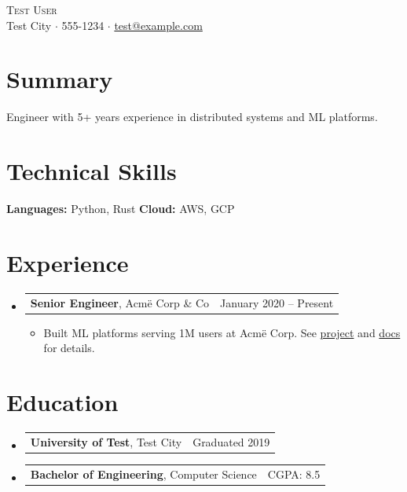 \documentclass[letterpaper,11pt]{article}
\makeatletter
\newcommand{\resumeItem}[1]{%
  \item\small{#1 \vspace{-1pt}}%
}
\newcommand{\resumeSubheading}[3]{%
  \vspace{2pt}\item
    \begin{tabular*}{\linewidth}[t]{l@{\extracolsep{\fill}}r}
      \textbf{#1}, #2 & #3 \\
    \end{tabular*}\vspace{-4pt}%
}
\newcommand{\resumeSubHeadingListStart}{\begin{itemize}[leftmargin=0.15in, label={}, parsep=0pt, topsep=0pt, itemsep=4pt]}
\newcommand{\resumeSubHeadingListEnd}{\end{itemize}}
\newcommand{\resumeItemListStart}{\begin{itemize}[leftmargin=0.15in, parsep=0pt, topsep=2pt, itemsep=3pt, label=$\bullet$]}
\newcommand{\resumeItemListEnd}{\end{itemize}\vspace{-2pt}}
\makeatother
\begin{document}
\begin{center}
{\Huge \scshape Test User} \\ \vspace{5pt}
\small Test City $\cdot$ 555-1234 $\cdot$ \href{mailto:test@example.com}{test@example.com}
\end{center}

\section{Summary}
{\small Engineer with 5+ years experience in distributed systems and ML platforms.}

\section{Technical Skills}
\begin{itemize}[leftmargin=0.15in, label={}, parsep=0pt, topsep=0pt, itemsep=0pt]
    \small{\item{
     \textbf{Languages:} Python, Rust
     \textbf{Cloud:} AWS, GCP
    }}
\end{itemize}

\section{Experience}
\resumeSubHeadingListStart
\resumeSubheading{Senior Engineer}{Acm{\"e} Corp \& Co}{January 2020 -- Present}
\resumeItemListStart
\resumeItem{Built ML platforms serving 1M users at Acm{\"e} Corp. See \href{https://github.com/x/y}{project} and \href{https://example.com}{docs} for details.}
\resumeItemListEnd
\resumeSubHeadingListEnd

\section{Education}
\resumeSubHeadingListStart
\resumeSubheading{University of Test}{Test City}{Graduated 2019}
\vspace{-15pt}
\resumeSubheading{Bachelor of Engineering}{Computer Science}{CGPA: 8.5}
\resumeSubHeadingListEnd
\end{document}
